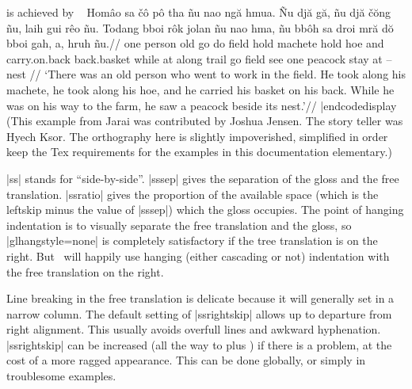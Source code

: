 \noindent is achieved by
\codedisplay~
\ex[glftpos=right,glhangstyle=none]
\let\\=\smallcaps
\begingl
\gla
Hom\^{a}o sa \v{c}\^{o} p\^{o} tha  \~{n}u nao ng\u{a} hmua. \~{N}u
dj\u{a} g\u{a}, \~{n}u dj\u{a} \v{c}\u{o}ng \~{n}u, laih gui r\^{e}o
\~{n}u. Todang bboi r\^{o}k jolan \~{n}u nao hma, \~{n}u bb\^{o}h sa
droi mr\u{a} d\u{o} bboi gah, a, hruh \~{n}u.//
\glb
\\{exist} one \\{clf} person old \\{3s} go do field \\{3s} hold
machete \\{3s} hold hoe \\{3s} and carry.on.back back.basket \\{3s}
while at along trail \\{3s} go field \\{3s} see one \\{clf} peacock
stay at \\{drct} -- nest \\{3s}//
\glft
`There was an old person who went to work in the field. He took
along his machete, he took along his hoe, and he carried his
basket on his back. While he was on his way to the farm, he saw a
peacock beside its nest.'//
\endgl
\xe
|endcodedisplay
(This example from Jarai was contributed by Joshua Jensen.  The story
teller was Hyech Ksor.  The orthography here is slightly impoverished,
simplified in order keep the Tex requirements for the examples in this
documentation elementary.)

|ss| stands for ``side-by-side''. |sssep| gives the separation of the
gloss and the free translation. |ssratio| gives the proportion of the
available space (which is the leftskip minus the value of |sssep|)
which the gloss occupies. The point of hanging indentation is to
visually separate the free translation and the gloss, so
|glhangstyle=none| is completely satisfactory if the tree translation
is on the right. But \ will happily use hanging (either
cascading or not) indentation with the free translation on the right.

Line breaking in the free translation is delicate because it will
generally set in a narrow column. The default setting of |ssrightskip|
allows up to \textdim{2 em} departure from right alignment. This usually avoids
overfull lines and awkward hyphenation.  |ssrightskip| can be
increased (all the way to \textdim{0 pt} plus ) if there is a
problem, at the cost of a more ragged appearance.  This can be done
globally, or simply in troublesome examples.

